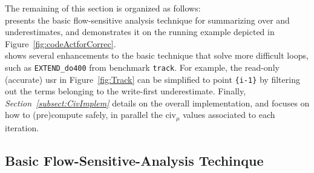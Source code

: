 \documentclass{sig-alternate}
\begin{document}
The remaining of this section is organized as follows:\\
%
 presents the basic flow-sensitive 
analysis technique for summarizing over and underestimates, and 
demonstrates it on the running example depicted in 
Figure~\ref{fig:codeActforCorrec}.\\
%
 shows several enhancements
to the basic technique that solve %
more difficult loops, such as {\tt EXTEND\_do400} from benchmark {\tt track}.
%
For example, the read-only (accurate) {\sc usr} in Figure~\ref{fig:Track}
can be simplified to point {\tt \{i-1\}} by filtering out the terms
belonging to the write-first underestimate.
%
Finally, {\em Section~\ref{subsect:CivImplem}} details on the overall 
implementation, and focuses on how to (pre)compute safely, in parallel 
the {\sc civ}$_\mu$ values associated to each iteration.


\subsection{Basic Flow-Sensitive-Analysis Techinque}
\label{subsec:BasicTechn}
\end{document}
